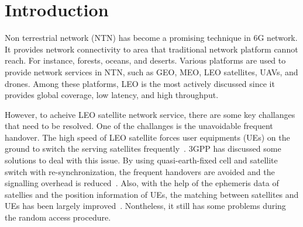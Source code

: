 \chapter{Introduction}
\label{chap:introduction}


Non terrestrial network (NTN) has become a promising technique in 6G network. It provides network connectivity to area that traditional network platform cannot reach. For instance, forests, oceans, and deserts. Various platforms are used to provide network services in NTN, such as GEO, MEO, LEO satellites, UAVs, and drones. Among these platforms, LEO is the most actively discussed since it provides global coverage, low latency, and high throughput. 

However, to acheive LEO satellite network service, there are some key challanges that need to be resolved. One of the challanges is the unavoidable frequent handover. The high speed of LEO satellite forces user equipments (UEs) on the ground to switch the serving satellites frequently~\cite{38821}. 3GPP has discussed some solutions to deal with this issue. By using quasi-earth-fixed cell and satellite switch with re-synchronization, the frequent handovers are avoided and the signalling overhead is reduced~\cite{38300}. Also, with the help of the ephemeris data of satellies and the position information of UEs, the matching between satellites and UEs has been largely improved~\cite{38331}. Nontheless, it still has some problems during the random access procedure. 